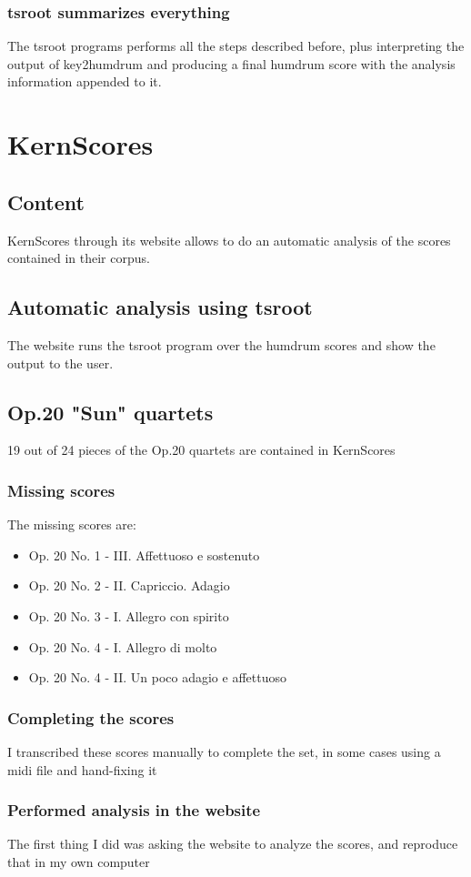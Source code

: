     \subsubsection{tsroot summarizes everything}
    The tsroot programs performs all the steps described before, plus interpreting the output of key2humdrum and producing a final humdrum score with the analysis information appended to it.
\section{KernScores}
  \subsection{Content}
  KernScores through its website allows to do an automatic analysis of the scores contained in their corpus.
  \subsection{Automatic analysis using tsroot}
  The website runs the tsroot program over the humdrum scores and show the output to the user.
  \subsection{Op.20 "Sun" quartets}
    19 out of 24 pieces of the Op.20 quartets are contained in KernScores
    \subsubsection{Missing scores}
    The missing scores are:
    \begin{itemize}
      \item Op. 20 No. 1 - III. Affettuoso e sostenuto
      \item Op. 20 No. 2 - II. Capriccio. Adagio
      \item Op. 20 No. 3 - I. Allegro con spirito
      \item Op. 20 No. 4 - I. Allegro di molto
      \item Op. 20 No. 4 - II. Un poco adagio e affettuoso
    \end{itemize}
    \subsubsection{Completing the scores}
    I transcribed these scores manually to complete the set, in some cases using a midi file and hand-fixing it
    \subsubsection{Performed analysis in the website}
    The first thing I did was asking the website to analyze the scores, and reproduce that in my own computer
